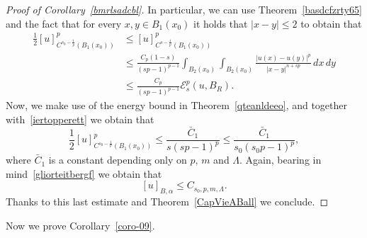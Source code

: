 \documentclass[12pt]{article}
\numberwithin{equation}{section}
\renewcommand{\leq}{\leqslant}
\begin{document}
\begin{proof}[Proof of Corollary~\ref{bmrlsadcbl}]
In particular, we can use Theorem~\ref{basdcfzrty65} and the fact that for every $x,y\in B_1(x_0)$ it holds that $\left|x-y\right|\leq 2$ to obtain that 
\begin{equation}\label{iertopperett}
\begin{split}
\frac{1}{2}\left[u\right]_{C^{s_0-\frac{1}{p}}(B_1(x_0))}^p &\leq \left[u\right]_{C^{s-\frac{1}{p}}(B_1(x_0))}^p\\
&\leq \frac{C_{p}(1-s)}{(sp-1)^{p-1}}\int_{B_2(x_0)}\int_{B_2(x_0)}\frac{\left|u(x)-u(y)\right|^p}{\left|x-y\right|^{n+sp}}\,dx\,dy\\
&\leq \frac{C_{p}}{(sp-1)^{p-1}} \mathcal{E}_s^p\left(u,B_R\right).
\end{split}
\end{equation}
Now, we make use of the energy bound in Theorem~\ref{qteanldeeo}, and together with~\eqref{iertopperett} we obtain that 
\begin{equation*}
\frac{1}{2}\left[u\right]_{C^{s_0-\frac{1}{p}}(B_1(x_0))}^p\leq \frac{\bar{C}_1}{s(sp-1)^{p}}\leq \frac{\bar{C}_1}{s_0(s_0p-1)^p},
\end{equation*} 
where $\bar{C}_1$ is a constant depending only on $p$, $m$ and $\Lambda$. Again, bearing in mind~\eqref{gliorteitbergf} we obtain that
\begin{equation*}
\left[u\right]_{B,\alpha} \leq C_{s_0,p,m,\Lambda}. 
\end{equation*}
Thanks to this last estimate and Theorem~\ref{CapVieABall} we conclude. 
\end{proof}






Now we prove Corollary~\ref{coro-09}. 
\end{document}
